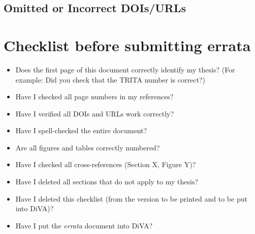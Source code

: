 \documentclass[
English,                 %
biblatex,             %
]{kththesis}
\begin{document}
\subsection*{Omitted or Incorrect DOIs/URLs}



\renewcommand{\bibname}{References}


\printbibliography[heading=bibintoc, title={References}]


\makeatletter
\if@todonotes@isFinal\relax %
\else
\clearpage
\section*{Checklist before submitting errata}
\begin{itemize}
\item[$\char"2610$] Does the first page of this document correctly identify my thesis? (For example: Did you check that the TRITA number is correct?)
\item[$\char"2610$] Have I checked all page numbers in my references?
\item[$\char"2610$] Have I verified all \glspl{DOI} and \glspl{URL} work correctly?
\item[$\char"2610$] Have I spell-checked the entire document?
\item[$\char"2610$] Are all figures and tables correctly numbered?
\item[$\char"2610$] Have I checked all cross-references (Section X, Figure Y)?
\item[$\char"2610$] Have I deleted all sections that do not apply to my thesis?
\item[$\char"2610$] Have I deleted this checklist (from the version to be printed and to be put into DiVA)?
\item[$\char"2610$] Have I put the \textit{errata} document into DiVA?
\end{itemize}
\fi
\makeatother
\end{document}
